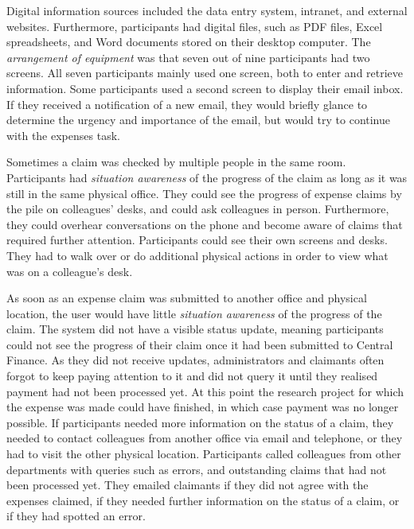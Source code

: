 Digital information sources included the data entry system, intranet, and external websites. Furthermore, participants had digital files, such as PDF files, Excel spreadsheets, and Word documents stored on their desktop computer. The \textit{arrangement of equipment} was that seven out of nine participants had two screens. All seven participants mainly used one screen, both to enter and retrieve information. Some participants used a second screen to display their email inbox. If they received a notification of a new email, they would briefly glance to determine the urgency and importance of the email, but would try to continue with the expenses task. 

Sometimes a claim was checked by multiple people in the same room. Participants had \textit{situation awareness} of the progress of the claim as long as it was still in the same physical office. They could see the progress of expense claims by the pile on colleagues' desks, and could ask colleagues in person. Furthermore, they could overhear conversations on the phone and become aware of claims that required further attention. Participants could see their own screens and desks. They had to walk over or do additional physical actions in order to view what was on a colleague's desk.  

As soon as an expense claim was submitted to another office and physical location, the user would have little \textit{situation awareness} of the progress of the claim. The system did not have a visible status update, meaning participants could not see the progress of their claim once it had been submitted to Central Finance. As they did not receive updates, administrators and claimants often forgot to keep paying attention to it and did not query it until they realised payment had not been processed yet. At this point the research project for which the expense was made could have finished, in which case payment was no longer possible. If participants needed more information on the status of a claim, they needed to contact colleagues from another office via email and telephone, or they had to visit the other physical location.  Participants called colleagues from other departments with queries such as errors, and outstanding claims that had not been processed yet. They emailed claimants if they did not agree with the expenses claimed, if they needed further information on the status of a claim, or if they had spotted an error.


